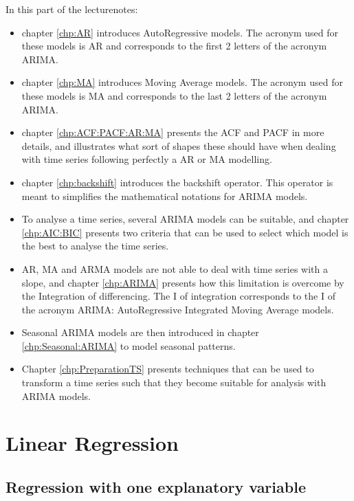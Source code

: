 \documentclass[a4paper,11pt,oneside,onecolumn]{book}
\begin{document}
\vspace{1cm}
\noindent In this part of the lecturenotes:
\begin{itemize} 
\item chapter \ref{chp:AR} introduces AutoRegressive models. The acronym used for these models is AR and corresponds to the first 2 letters of the acronym ARIMA.  
\item chapter \ref{chp:MA} introduces Moving Average models. The acronym used for these models is MA and corresponds to the last 2 letters of the acronym ARIMA. 
\item chapter \ref{chp:ACF:PACF:AR:MA} presents the ACF and PACF in more details, and illustrates what sort of shapes these should have when dealing with time series following perfectly  a AR or MA modelling.
\item chapter \ref{chp:backshift} introduces the backshift operator. This operator is meant to simplifies the mathematical notations for ARIMA models. 
\item To analyse a time series, several ARIMA models can be suitable, and chapter \ref{chp:AIC:BIC} presents two criteria that can be used to select which model is the best to analyse the time series.
\item AR, MA and ARMA models  are not able to deal with time series with a slope, and  chapter \ref{chp:ARIMA} presents how this limitation is overcome by the Integration of differencing.
The I of integration corresponds to the I of the acronym ARIMA: AutoRegressive Integrated Moving Average models.  
\item Seasonal ARIMA models are then introduced in chapter \ref{chp:Seasonal:ARIMA} to model seasonal patterns.


\item Chapter \ref{chp:PreparationTS} presents techniques that can be used to transform a time series such that they become suitable for analysis with ARIMA models.

\end{itemize}

\chapter{Linear Regression} \label{chap:linear:regression}
\label{chp:LR}

\section{Regression with one explanatory variable} 
\end{document}
